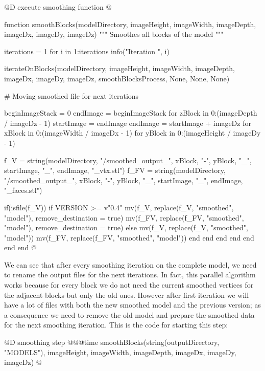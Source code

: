 \documentclass[11pt,oneside]{article}	%
\begin{document}
@D execute smoothing function
@{function smoothBlocks(modelDirectory,
                      imageHeight, imageWidth, imageDepth,
                      imageDx, imageDy, imageDz)
  """
  Smoothes all blocks of the
  model
  """
   
  iterations = 1
  for i in 1:iterations
    info("Iteration ", i)

    iterateOnBlocks(modelDirectory,
                    imageHeight, imageWidth, imageDepth,
                    imageDx, imageDy, imageDz,
                    smoothBlocksProcess,
                    None, None, None)

    # Moving smoothed file for next iterations

    beginImageStack = 0
    endImage = beginImageStack
    for zBlock in 0:(imageDepth / imageDz - 1)
      startImage = endImage
      endImage = startImage + imageDz
      for xBlock in 0:(imageWidth / imageDx - 1)
        for yBlock in 0:(imageHeight / imageDy - 1)

          f_V = string(modelDirectory, "/smoothed_output_", xBlock, "-", yBlock, "_",
                       startImage, "_", endImage, "_vtx.stl")
          f_FV = string(modelDirectory, "/smoothed_output_", xBlock, "-", yBlock, "_",
                        startImage, "_", endImage, "_faces.stl")

          if(isfile(f_V))
            if VERSION >= v"0.4"
              mv(f_V, replace(f_V, "smoothed", "model"), remove_destination = true)
              mv(f_FV, replace(f_FV, "smoothed", "model"), remove_destination = true)
            else
              mv(f_V, replace(f_V, "smoothed", "model"))
              mv(f_FV, replace(f_FV, "smoothed", "model"))
            end
          end
        end
      end
    end
  end
end @}

We can see that after every smoothing iteration on the complete model, we need to rename the output files for the next iterations. In fact, this parallel algorithm works because for every block we do not need the current smoothed vertices for the adjacent blocks but only the old ones. However after first iteration we will have a lot of files with both the new smoothed model and the previous version; as a consequence we need to remove the old model and prepare the smoothed data for the next smoothing iteration.
This is the code for starting this step:

@D smoothing step
@{@@time smoothBlocks(string(outputDirectory, "MODELS"),
	      imageHeight, imageWidth, imageDepth,
	      imageDx, imageDy, imageDz) @}
                      
\end{document}
